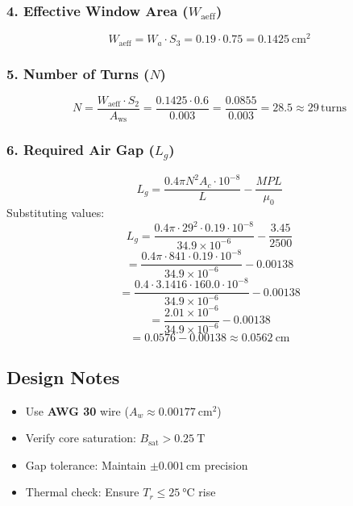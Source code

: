 \documentclass{article}
\begin{document}
\subsubsection*{4. Effective Window Area (\( W_{\text{aeff}} \))}
\[
W_{\text{aeff}} = W_a \cdot S_3 
  = 0.19 \cdot 0.75 
  = \SI{0.1425}{\centi\meter\squared}
\]

\subsubsection*{5. Number of Turns (\( N \))}
\[
N = \frac{W_{\text{aeff}} \cdot S_2}{A_{\text{ws}}} 
  = \frac{0.1425 \cdot 0.6}{0.003} 
  = \frac{0.0855}{0.003} 
  = 28.5 \approx \boxed{29 \, \text{turns}}
\]

\subsubsection*{6. Required Air Gap (\( L_g \))}
\[
L_g = \frac{0.4\pi N^2 A_c \cdot 10^{-8}}{L} - \frac{MPL}{\mu_0}
\]
Substituting values:
\[
L_g = \frac{0.4\pi \cdot 29^2 \cdot 0.19 \cdot 10^{-8}}{34.9 \times 10^{-6}} - \frac{3.45}{2500}
\]
\[
= \frac{0.4\pi \cdot 841 \cdot 0.19 \cdot 10^{-8}}{34.9 \times 10^{-6}} - 0.00138
\]
\[
= \frac{0.4 \cdot 3.1416 \cdot 160.0 \cdot 10^{-8}}{34.9 \times 10^{-6}} - 0.00138
\]
\[
= \frac{2.01 \times 10^{-6}}{34.9 \times 10^{-6}} - 0.00138
\]
\[
= 0.0576 - 0.00138 \approx \SI{0.0562}{\centi\meter}
\]

\subsection*{Design Notes}
\begin{itemize}
\item Use \textbf{AWG 30} wire (\( A_w \approx \SI{0.00177}{\centi\meter\squared} \))
\item Verify core saturation: \( B_{\text{sat}} > \SI{0.25}{\tesla} \)
\item Gap tolerance: Maintain \( \pm 0.001\, \text{cm} \) precision
\item Thermal check: Ensure \( T_r \leq \SI{25}{\celsius} \) rise
\end{itemize}
\end{document}
